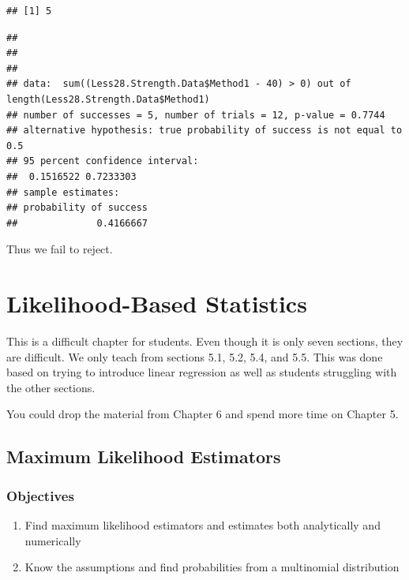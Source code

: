 \documentclass[]{book}
\newenvironment{Shaded}{\begin{snugshade}}{\end{snugshade}}
\newcommand{\KeywordTok}[1]{\textcolor[rgb]{0.13,0.29,0.53}{\textbf{#1}}}
\newcommand{\DecValTok}[1]{\textcolor[rgb]{0.00,0.00,0.81}{#1}}
\newcommand{\OperatorTok}[1]{\textcolor[rgb]{0.81,0.36,0.00}{\textbf{#1}}}
\newcommand{\NormalTok}[1]{#1}
\providecommand{\tightlist}{%
  \setlength{\itemsep}{0pt}\setlength{\parskip}{0pt}}
\theoremstyle{definition}
\theoremstyle{definition}
\theoremstyle{definition}
\theoremstyle{remark}
\begin{document}
\begin{verbatim}
## [1] 5
\end{verbatim}

\begin{Shaded}
\end{Shaded}

\begin{verbatim}
## 
## 
## 
## data:  sum((Less28.Strength.Data$Method1 - 40) > 0) out of length(Less28.Strength.Data$Method1)
## number of successes = 5, number of trials = 12, p-value = 0.7744
## alternative hypothesis: true probability of success is not equal to 0.5
## 95 percent confidence interval:
##  0.1516522 0.7233303
## sample estimates:
## probability of success 
##              0.4166667
\end{verbatim}

Thus we fail to reject.

\chapter{Likelihood-Based Statistics}\label{Chpt5}

This is a difficult chapter for students. Even though it is only seven
sections, they are difficult. We only teach from sections 5.1, 5.2, 5.4,
and 5.5. This was done based on trying to introduce linear regression as
well as students struggling with the other sections.

You could drop the material from Chapter 6 and spend more time on
Chapter 5.

\hypertarget{L25}{\section{Maximum Likelihood Estimators}\label{L25}}

\subsection{Objectives}\label{objectives-24}

\begin{enumerate}
\def\labelenumi{\arabic{enumi}.}
\tightlist
\item
  Find maximum likelihood estimators and estimates both analytically and
  numerically\\
\item
  Know the assumptions and find probabilities from a multinomial
  distribution
\end{enumerate}
\end{document}
